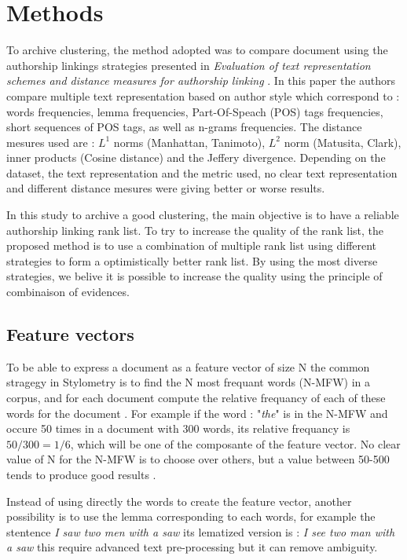 \section{Methods}

To archive clustering, the method adopted was to compare document using the authorship linkings strategies presented in \textit{Evaluation of text representation schemes and distance measures for authorship linking} \cite{kocher_verification}.
In this paper the authors compare multiple text representation based on author style which correspond to : words frequencies, lemma frequencies, Part-Of-Speach (POS) tags frequencies, short sequences of POS tags, as well as n-grams frequencies.
The distance mesures used are : $L^1$ norms (Manhattan, Tanimoto), $L^2$ norm (Matusita, Clark), inner products (Cosine distance) and the Jeffery divergence.
Depending on the dataset, the text representation and the metric used, no clear text representation and different distance mesures were giving better or worse results.

In this study to archive a good clustering, the main objective is to have a reliable authorship linking rank list.
To try to increase the quality of the rank list, the proposed method is to use a combination of multiple rank list using different strategies to form a optimistically better rank list.
By using the most diverse strategies, we belive it is possible to increase the quality using the principle of combinaison of evidences.

\subsection{Feature vectors}

To be able to express a document as a feature vector of size N the common stragegy in Stylometry is to find the N most frequant words (N-MFW) in a corpus, and for each document compute the relative frequancy of each of these words for the document \cite{savoy_stylo}.
For example if the word : "\textit{the}" is in the N-MFW and occure 50 times in a document with 300 words, its relative frequancy is $50/300 = 1/6$, which will be one of the composante of the feature vector.
No clear value of N for the N-MFW is to choose over others, but a value between 50-500 tends to produce good results \cite{savoy_text_representation}.

Instead of using directly the words to create the feature vector, another possibility is to use the lemma corresponding to each words, for example the stentence \textit{I saw two men with a saw} its lematized version is : \textit{I see two man with a saw} this require advanced text pre-processing but it can remove ambiguity.

